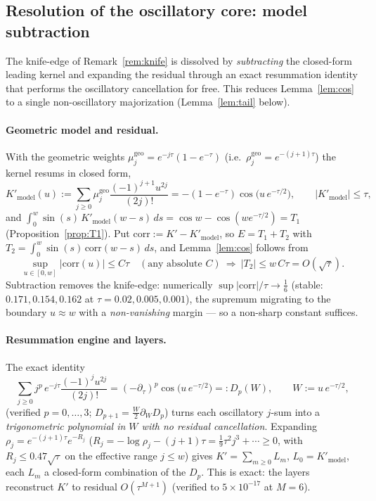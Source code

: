 \subsection{Resolution of the oscillatory core: model subtraction}
\label{ss:modelsub}

The knife-edge of Remark~\ref{rem:knife} is dissolved by \emph{subtracting} the
closed-form leading kernel and expanding the residual through an exact resummation
identity that performs the oscillatory cancellation for free. This reduces
Lemma~\ref{lem:cos} to a single non-oscillatory majorization (Lemma~\ref{lem:tail} below).

\paragraph{Geometric model and residual.} With the geometric weights
$\mu_j^{\mathrm{geo}}=e^{-j\tau}(1-e^{-\tau})$ \textup(i.e.\ $\rho_j^{\mathrm{geo}}
=e^{-(j+1)\tau}$\textup) the kernel resums in closed form,
\begin{equation}\label{eq:Kmodel}
  K'_{\mathrm{model}}(u):=\sum_{j\ge0}\mu_j^{\mathrm{geo}}\frac{(-1)^{j+1}u^{2j}}{(2j)!}
  =-(1-e^{-\tau})\cos\!\bigl(u\,e^{-\tau/2}\bigr),\qquad |K'_{\mathrm{model}}|\le\tau,
\end{equation}
and $\int_0^w\sin(s)\,K'_{\mathrm{model}}(w-s)\,ds=\cos w-\cos(we^{-\tau/2})=T_1$
(Proposition~\ref{prop:T1}). Put $\mathrm{corr}:=K'-K'_{\mathrm{model}}$, so $E=T_1+T_2$
with $T_2=\int_0^w\sin(s)\,\mathrm{corr}(w-s)\,ds$, and Lemma~\ref{lem:cos} follows from
\begin{equation}\label{eq:corrgoal}
  \sup_{u\in[0,w]}|\mathrm{corr}(u)|\le C\tau\quad(\text{any absolute }C)
  \ \Longrightarrow\ |T_2|\le w\,C\tau=O(\sqrt\tau).
\end{equation}
Subtraction removes the knife-edge: numerically $\sup|\mathrm{corr}|/\tau\to\tfrac16$
(stable: $0.171,0.154,0.162$ at $\tau=0.02,0.005,0.001$), the supremum migrating to the
boundary $u\approx w$ with a \emph{non-vanishing} margin --- so a non-sharp constant suffices.

\paragraph{Resummation engine and layers.} The exact identity
\begin{equation}\label{eq:engine}
  \sum_{j\ge0}j^{p}\,e^{-j\tau}\frac{(-1)^{j}u^{2j}}{(2j)!}
  =(-\partial_\tau)^{p}\cos\!\bigl(u\,e^{-\tau/2}\bigr)=:D_p(W),\qquad W:=u\,e^{-\tau/2},
\end{equation}
\textup(verified $p=0,\dots,3$; $D_{p+1}=\tfrac{W}{2}\partial_W D_p$\textup) turns each
oscillatory $j$-sum into a \emph{trigonometric polynomial in $W$ with no residual
cancellation}. Expanding $\rho_j=e^{-(j+1)\tau}e^{-R_j}$ \textup($R_j=-\log\rho_j-(j+1)\tau
=\tfrac19\tau^2 j^3+\cdots\ge0$, with $R_j\le0.47\sqrt\tau$ on the effective range $j\le w$\textup)
gives $K'=\sum_{m\ge0}L_m$, $L_0=K'_{\mathrm{model}}$, each $L_m$ a closed-form
combination of the $D_p$. This is exact: the layers reconstruct $K'$ to residual
$O(\tau^{M+1})$ \textup(verified to $5\times10^{-17}$ at $M=6$\textup).

